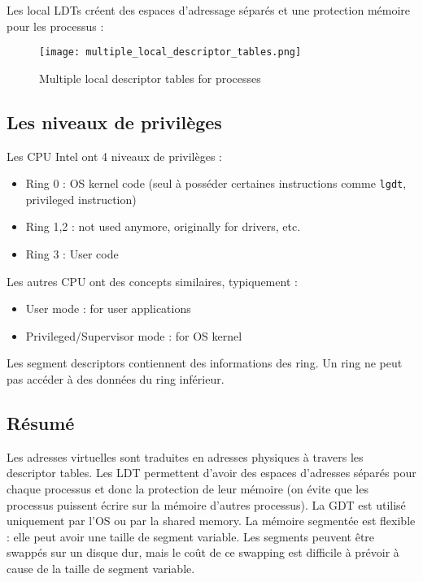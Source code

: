 Les local LDTs créent des espaces d'adressage séparés et une protection
mémoire pour les processus :

\begin{figure}[!ht]
    \centering
    \texttt{[image: multiple\_local\_descriptor\_tables.png]}
    \caption{Multiple local descriptor tables for processes}
\end{figure}

\subsection{Les niveaux de privilèges}

Les CPU Intel ont 4 niveaux de privilèges :

\bigskip
\begin{itemize}
    \item Ring 0 : OS kernel code (seul à posséder certaines
        instructions comme \verb#lgdt#, privileged instruction)
    \item Ring 1,2 : not used anymore, originally for drivers, etc.
    \item Ring 3 : User code
\end{itemize}
\bigskip

Les autres CPU ont des concepts similaires, typiquement :

\bigskip
\begin{itemize}
    \item User mode : for user applications
    \item Privileged/Supervisor mode : for OS kernel
\end{itemize}
\bigskip

Les segment descriptors contiennent des informations des ring. Un ring
ne peut pas accéder à des données du ring inférieur. \newline

\subsection{Résumé}

Les adresses virtuelles sont traduites en adresses physiques à travers
les descriptor tables. Les LDT permettent d'avoir des espaces d'adresses
séparés pour chaque processus et donc la protection de leur mémoire (on
évite que les processus puissent écrire sur la mémoire d'autres
processus). La GDT est utilisé uniquement par l'OS ou par la shared
memory. La mémoire segmentée est flexible : elle peut avoir une taille
de segment variable. Les segments peuvent être swappés sur un disque
dur, mais le coût de ce swapping est difficile à prévoir à cause de la
taille de segment variable.


